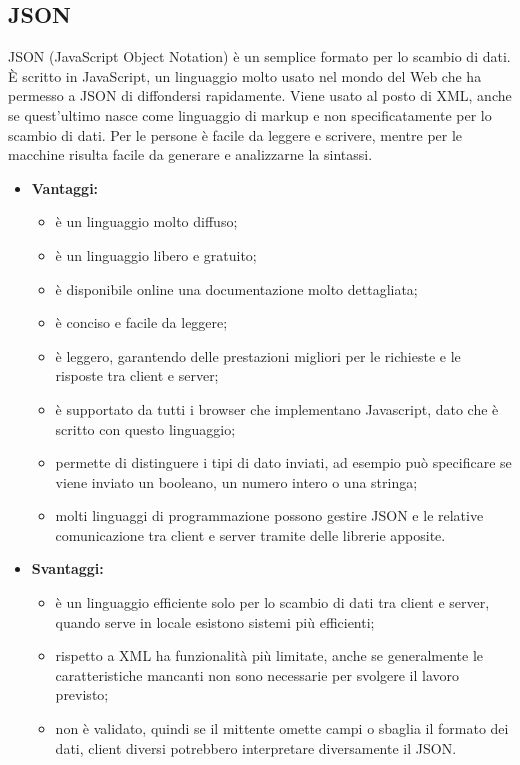 \subsection{JSON}
	JSON (JavaScript Object Notation) è un semplice formato per lo scambio di dati. È scritto in JavaScript, un linguaggio molto usato nel mondo del Web che ha permesso a JSON di diffondersi rapidamente. Viene usato al posto di XML, anche se quest'ultimo nasce come linguaggio di markup e non specificatamente per lo scambio di dati. Per le persone è facile da leggere e scrivere, mentre per le macchine risulta facile da generare e analizzarne la sintassi.
	
	\begin{itemize}
		\item \textbf{Vantaggi:}
			\begin{itemize}
				\item è un linguaggio molto diffuso;
				\item è un linguaggio libero e gratuito;
				\item è disponibile online una documentazione molto dettagliata;
				\item è conciso e facile da leggere;
				\item è leggero, garantendo delle prestazioni migliori per le richieste e le risposte tra client e server;
				\item è supportato da tutti i browser che implementano Javascript, dato che è scritto con questo linguaggio;
				\item permette di distinguere i tipi di dato inviati, ad esempio può specificare se viene inviato un booleano, un numero intero o una stringa;
				\item molti linguaggi di programmazione possono gestire JSON e le relative comunicazione tra client e server tramite delle librerie apposite.
			\end{itemize}
		\item \textbf{Svantaggi:}
			\begin{itemize}
				\item è un linguaggio efficiente solo per lo scambio di dati tra client e server, quando serve in locale esistono sistemi più efficienti;
				\item rispetto a XML ha funzionalità più limitate, anche se generalmente le caratteristiche mancanti non sono necessarie per svolgere il lavoro previsto;
				\item non è validato, quindi se il mittente omette campi o sbaglia il formato dei dati, client diversi potrebbero interpretare diversamente il JSON.
			\end{itemize}
	\end{itemize}

